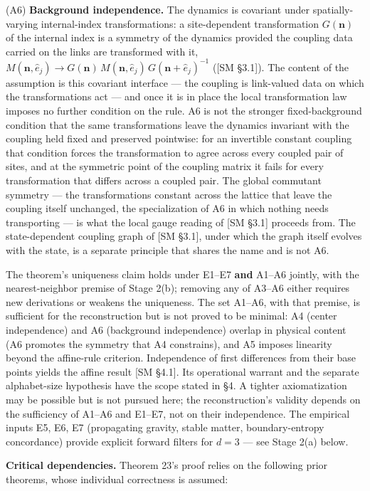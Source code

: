 \documentclass[
]{article}
\begin{document}
(A6) \textbf{Background independence.} The dynamics is covariant under
spatially-varying internal-index transformations: a site-dependent
transformation \(G(\mathbf{n})\) of the internal index is a symmetry of
the dynamics provided the coupling data carried on the links are
transformed with it,
\(M(\mathbf{n}, \hat{e}_j) \to G(\mathbf{n})\,M(\mathbf{n}, \hat{e}_j)\,G(\mathbf{n}+\hat{e}_j)^{-1}\)
({[}SM §3.1{]}). The content of the assumption is this covariant
interface --- the coupling is link-valued data on which the
transformations act --- and once it is in place the local transformation
law imposes no further condition on the rule. A6 is not the stronger
fixed-background condition that the same transformations leave the
dynamics invariant with the coupling held fixed and preserved pointwise:
for an invertible constant coupling that condition forces the
transformation to agree across every coupled pair of sites, and at the
symmetric point of the coupling matrix it fails for every transformation
that differs across a coupled pair. The global commutant symmetry ---
the transformations constant across the lattice that leave the coupling
itself unchanged, the specialization of A6 in which nothing needs
transporting --- is what the local gauge reading of {[}SM §3.1{]}
proceeds from. The state-dependent coupling graph of {[}SM §3.1{]},
under which the graph itself evolves with the state, is a separate
principle that shares the name and is not A6.

The theorem's uniqueness claim holds under E1--E7 \textbf{and} A1--A6
jointly, with the nearest-neighbor premise of Stage 2(b); removing any
of A3--A6 either requires new derivations or weakens the uniqueness. The
set A1--A6, with that premise, is sufficient for the reconstruction but
is not proved to be minimal: A4 (center independence) and A6 (background
independence) overlap in physical content (A6 promotes the symmetry that
A4 constrains), and A5 imposes linearity beyond the affine-rule
criterion. Independence of first differences from their base points
yields the affine result {[}SM §4.1{]}. Its operational warrant and the
separate alphabet-size hypothesis have the scope stated in §4. A tighter
axiomatization may be possible but is not pursued here; the
reconstruction's validity depends on the sufficiency of A1--A6 and
E1--E7, not on their independence. The empirical inputs E5, E6, E7
(propagating gravity, stable matter, boundary-entropy concordance)
provide explicit forward filters for \(d = 3\) --- see Stage 2(a) below.

\textbf{Critical dependencies.} Theorem 23's proof relies on the
following prior theorems, whose individual correctness is assumed:
\end{document}
